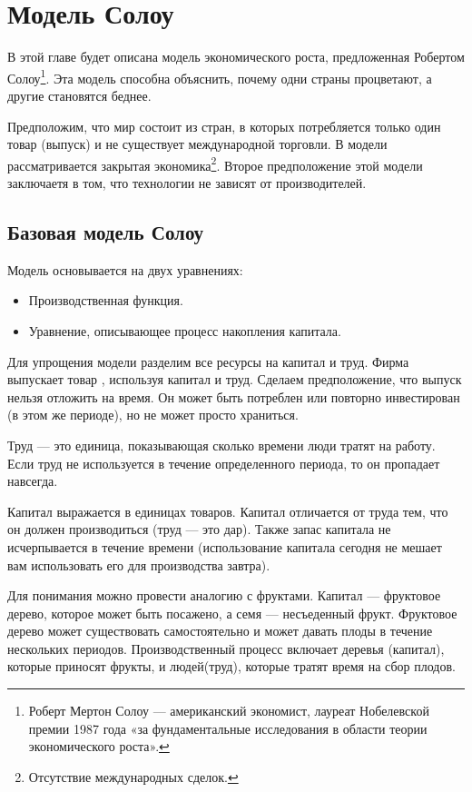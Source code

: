 \chapter{Модель Солоу}
\label{cha:solow_models}

В этой главе будет описана модель экономического роста, предложенная Робертом Солоу\footnote{Роберт Мертон Солоу --- американский экономист, лауреат Нобелевской премии 1987 года «за фундаментальные исследования в области теории экономического роста»\cite{wiki_solow}.}.
Эта модель способна объяснить, почему одни страны процветают, а другие становятся беднее.

Предположим, что мир состоит из стран, в которых потребляется только один товар (выпуск) и не существует международной торговли.
В модели рассматривается закрытая экономика\footnote{Отсутствие международных сделок.}.
Второе предположение этой модели заключаетя в том, что технологии не зависят от производителей.

\section{Базовая модель Солоу}

Модель основывается на двух уравнениях:
\begin{itemize}
	\item Производственная функция.
	\item Уравнение, описывающее процесс накопления капитала.
\end{itemize}

Для упрощения модели разделим все ресурсы на капитал и труд.
Фирма выпускает товар , используя капитал и труд.
Сделаем предположение, что выпуск нельзя отложить на время.
Он может быть потреблен или повторно инвестирован (в этом же периоде), но не может просто храниться.

Труд --- это единица, показывающая сколько времени люди тратят на работу.
Если труд не используется в течение определенного периода, то он пропадает навсегда.

Капитал выражается в единицах товаров.
Капитал отличается от труда тем, что он должен производиться (труд --- это дар).
Также запас капитала не исчерпывается в течение времени (использование капитала сегодня не мешает вам использовать его для производства завтра).

Для понимания можно провести аналогию с фруктами.
Капитал --- фруктовое дерево, которое может быть посажено, а семя --- несъеденный фрукт.
Фруктовое дерево может существовать самостоятельно и может давать плоды в течение нескольких периодов.
Производственный процесс включает деревья (капитал), которые приносят фрукты, и людей(труд), которые тратят время на сбор плодов.


